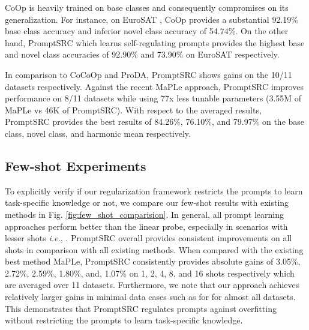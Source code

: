 \documentclass[10pt,twocolumn,letterpaper]{article}
\def\ie{\emph{i.e.}\xspace}
\begin{document}
CoOp is heavily trained on base classes and consequently compromises on its generalization. For instance, on EuroSAT \cite{helber2019eurosat}, CoOp provides a substantial 92.19\% base class accuracy and inferior novel class accuracy of 54.74\%. On the other hand, PromptSRC which learns self-regulating prompts provides the highest base and novel class accuracies of 92.90\% and 73.90\% on EuroSAT respectively.

In comparison to CoCoOp and ProDA, PromptSRC shows gains on the 10/11 datasets respectively. {Against the recent MaPLe approach, PromptSRC improves performance on 8/11 datasets while using 77x less tunable parameters (3.55M of MaPLe vs 46K of PromptSRC).} With respect to the averaged results, PromptSRC provides the best results of 84.26\%, 76.10\%, and 79.97\%  on the base class, novel class, and harmonic mean respectively. 

\subsection{Few-shot Experiments}
To explicitly verify if our regularization framework restricts the prompts to learn task-specific knowledge or not, we compare our few-shot results with existing methods in Fig. \ref{fig:few_shot_comparision}.
In general, all prompt learning approaches perform better than the linear probe, especially in scenarios with lesser shots \ie, . PromptSRC overall provides consistent improvements on all shots in comparison with all existing methods. {When compared with the existing best method MaPLe, PromptSRC consistently provides absolute gains of 3.05\%, 2.72\%, 2.59\%,	1.80\%, and, 1.07\% on 1, 2, 4, 8, and 16 shots respectively which are averaged over 11 datasets.} 
Furthermore, we note that our approach achieves relatively larger gains in minimal data cases such as for  for almost all datasets. This demonstrates that PromptSRC regulates prompts against overfitting without restricting the prompts to learn task-specific knowledge. 
\end{document}
